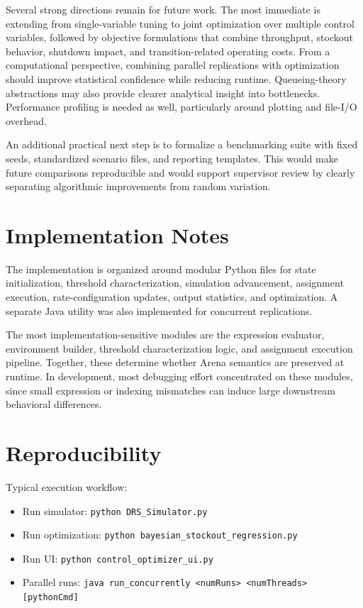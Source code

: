\documentclass[11pt]{article}
\begin{document}
Several strong directions remain for future work. The most immediate is extending from single-variable tuning to joint optimization over multiple control variables, followed by objective formulations that combine throughput, stockout behavior, shutdown impact, and transition-related operating costs. From a computational perspective, combining parallel replications with optimization should improve statistical confidence while reducing runtime. Queueing-theory abstractions may also provide clearer analytical insight into bottlenecks. Performance profiling is needed as well, particularly around plotting and file-I/O overhead.

An additional practical next step is to formalize a benchmarking suite with fixed seeds, standardized scenario files, and reporting templates. This would make future comparisons reproducible and would support supervisor review by clearly separating algorithmic improvements from random variation.

\appendix

\section{Implementation Notes}
The implementation is organized around modular Python files for state initialization, threshold characterization, simulation advancement, assignment execution, rate-configuration updates, output statistics, and optimization. A separate Java utility was also implemented for concurrent replications.

The most implementation-sensitive modules are the expression evaluator, environment builder, threshold characterization logic, and assignment execution pipeline. Together, these determine whether Arena semantics are preserved at runtime. In development, most debugging effort concentrated on these modules, since small expression or indexing mismatches can induce large downstream behavioral differences.

\section{Reproducibility}
Typical execution workflow:
\begin{itemize}
	\item Run simulator: \texttt{python DRS\_Simulator.py}
	\item Run optimization: \texttt{python bayesian\_stockout\_regression.py}
	\item Run UI: \texttt{python control\_optimizer\_ui.py}
	\item Parallel runs: \texttt{java run\_concurrently <numRuns> <numThreads> [pythonCmd]}
\end{itemize}
\end{document}
